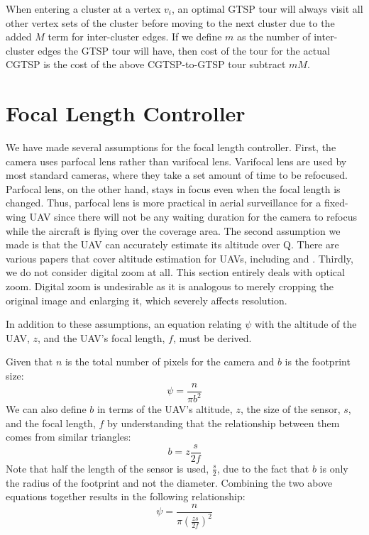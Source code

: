 \documentclass[conference]{IEEEtran}
\theoremstyle{plain}%
\begin{document}
When entering a cluster at a vertex $v_i$, an optimal GTSP tour will always visit all other vertex sets of the cluster before moving to the next cluster due to the added $M$ term for inter-cluster edges. If we define $m$ as the number of inter-cluster edges the GTSP tour will have, then cost of the tour for the actual CGTSP is the cost of the above CGTSP-to-GTSP tour subtract $mM$.


\section{Focal Length Controller}

We have made several assumptions for the focal length controller. First, the camera uses parfocal lens rather than varifocal lens. Varifocal lens are used by most standard cameras, where they take a set amount of time to be refocused. Parfocal lens, on the other hand, stays in focus even when the focal length is changed. Thus, parfocal lens is more practical in aerial surveillance for a fixed-wing UAV since there will not be any waiting duration for the camera to refocus while the aircraft is flying over the coverage area.
The second assumption we made is that the UAV can accurately estimate its altitude over Q. There are various papers that cover altitude estimation for UAVs, including \cite{eynard2010uav} and \cite{cherian2009autonomous}.
Thirdly, we do not consider digital zoom at all. This section entirely deals with optical zoom. Digital zoom is undesirable as it is analogous to merely cropping the original image and enlarging it, which severely affects resolution.

In addition to these assumptions, an equation relating $\psi$ with the altitude of the UAV, $z$, and the UAV's focal length, $f$, must be derived.

Given that $n$ is the total number of pixels for the camera and $b$ is the footprint size:
\begin{equation}
\psi =  \frac{n}{\pi b^2}
\end{equation}
We can also define $b$ in terms of the UAV's altitude, $z$, the size of the sensor, $s$, and the focal length, $f$ by understanding that the relationship between them comes from similar triangles:
\begin{equation}
b = z \frac{s}{2f}
\end{equation}
Note that half the length of the sensor is used, $\frac{s}{2}$, due to the fact that $b$ is only the radius of the footprint and not the diameter.
Combining the two above equations together results in the following relationship:
\begin{equation} \label{eq:psi_z_f}
\psi = \frac{n}{\pi \left(\frac{zs}{2f}\right)^2}
\end{equation}
\end{document}
